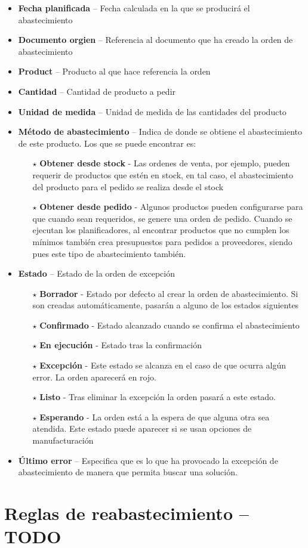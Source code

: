 \begin{itemize}
  \item \textbf{Fecha planificada} -- Fecha calculada en la que se producirá el abastecimiento
  \item \textbf{Documento orgien} -- Referencia al documento que ha creado la orden de abastecimiento
  \item \textbf{Product} -- Producto al que hace referencia la orden
  \item \textbf{Cantidad} -- Cantidad de producto a pedir
  \item \textbf{Unidad de medida} -- Unidad de medida de las cantidades del producto
  \item \textbf{Método de abastecimiento} -- Indica de donde se obtiene el abastecimiento de este producto. Los que se puede encontrar es:
    \begin{itemize}
       \item[$\star$] \textbf{Obtener desde stock} - Las ordenes de venta, por ejemplo, pueden requerir de productos que estén en stock, en tal
                                                    caso, el abastecimiento del producto para el pedido se realiza desde el stock
       \item[$\star$] \textbf{Obtener desde pedido} - Algunos productos pueden configurarse para que cuando sean requeridos, se genere una orden 
                                                    de pedido. Cuando se ejecutan los planificadores, al encontrar productos que no cumplen los
                                                    mínimos también crea presupuestos para pedidos a proveedores, siendo pues este tipo de
                                                    abastecimiento también.
    \end{itemize}
  \item \textbf{Estado} -- Estado de la orden de excepción
    \begin{itemize}
      \item[$\star$] \textbf{Borrador} - Estado por defecto al crear la orden de abastecimiento. Si son creadas automáticamente, pasarán a alguno
                                         de los estados siguientes
      \item[$\star$] \textbf{Confirmado} - Estado alcanzado cuando se confirma el abastecimiento
      \item[$\star$] \textbf{En ejecución} - Estado tras la confirmación
      \item[$\star$] \textbf{Excepción} - Este estado se alcanza en el caso de que ocurra algún error. La orden aparecerá en rojo.
      \item[$\star$] \textbf{Listo} - Tras eliminar la excepción la orden pasará a este estado.
      \item[$\star$] \textbf{Esperando} - La orden está a la espera de que alguna otra sea atendida. Este estado puede aparecer si se usan opciones
                                          de manufacturación
    \end{itemize}
  \item \textbf{Último error} -- Especifica que es lo que ha provocado la excepción de abastecimiento de manera que permita buscar una solución.
\end{itemize}

\section{Reglas de reabastecimiento -- TODO}
\label{alm:reabastecimiento}
